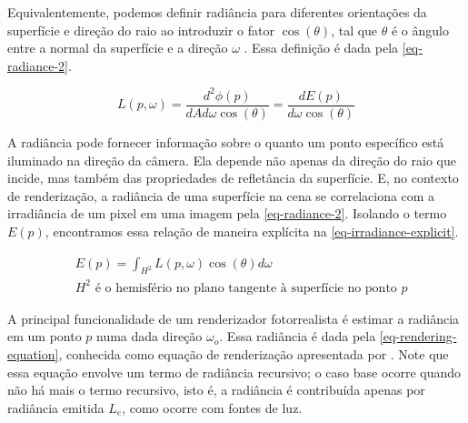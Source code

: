 \documentclass[english,
               brazil,
               bsc] %
               {dcomp-abntex2}
\begin{document}


Equivalentemente, podemos definir radiância para diferentes orientações da superfície e direção do raio ao introduzir o fator $\cos(\theta)$, tal que $\theta$ é o ângulo entre a normal da superfície e a direção ${\omega}$ \cite[5.4.1]{pbr}. Essa definição é dada pela \autoref{eq-radiance-2}. 


\begin{equation} \label{eq-radiance-2}
  L(p,{\omega}) = \frac{d^2\phi(p)}{dAd{\omega} \cos(\theta)} = \frac{dE(p)}{d{\omega} \cos(\theta)} 
\end{equation}




A radiância pode fornecer informação sobre o quanto um ponto específico está iluminado na direção da câmera. Ela depende não apenas da direção do raio que incide, mas também das propriedades de refletância da superfície. E, no contexto de renderização, a radiância de uma superfície na cena se correlaciona com a irradiância de um pixel em uma imagem pela \autoref{eq-radiance-2}. Isolando o termo $E(p)$, encontramos essa relação de maneira explícita na \autoref{eq-irradiance-explicit}.


\begin{equation} \label{eq-irradiance-explicit}
  \begin{aligned}
  &E(p) = \int_{H^2}{L(p,{\omega})\cos(\theta)d{\omega}}\\
  &H^2 \text{ é o hemisfério no plano tangente à superfície no ponto $p$}
  \end{aligned}
\end{equation}




A principal funcionalidade de um renderizador fotorrealista é estimar a radiância em um ponto $p$ numa dada direção ${\omega}_o$. Essa radiância é dada pela \autoref{eq-rendering-equation}, conhecida como equação de renderização apresentada por . Note que essa equação envolve um termo de radiância recursivo; o caso base ocorre quando não há mais o termo recursivo, isto é, a radiância é contribuída apenas por radiância emitida $L_e$, como ocorre com fontes de luz.
\end{document}
